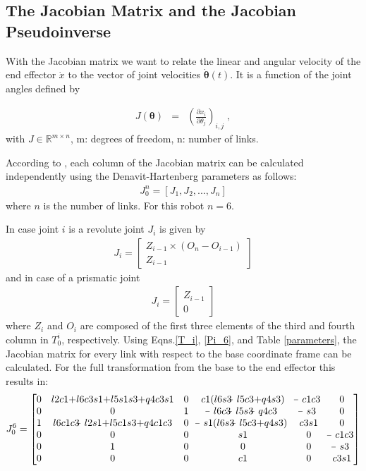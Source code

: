 \subsection{The Jacobian Matrix and the Jacobian Pseudoinverse}

With the Jacobian matrix we want to relate the linear and angular velocity of the end effector $\dot{x}$ to the vector of joint velocities $\dot{\bm{\theta}}(t)$. It is a function of the joint angles defined by

\begin{eqnarray}
	J(\bm{\theta}) &=&(\frac{\partial x_i}{\partial\theta_j})_{i,j} \; ,
\end{eqnarray}
with $J \in \mathbb{R}^{m\times n}$, m: degrees of freedom, n: number of links.
 
According to \cite{textbookJacobian}, each column of the Jacobian matrix can be calculated independently using  the Denavit-Hartenberg parameters as follows:
\begin{eqnarray}
	J_0^n=[J_1,J_2,... ,J_n]
\end{eqnarray}
where $n$ is the number of links. For this robot $n=6$.

In case joint $i$ is a revolute joint $J_i$ is given by
\begin{eqnarray}\label{i_revolute}
	J_i=	\begin{bmatrix}
			Z_{i-1}\times(O_n-O_{i-1})\\
			Z_{i-1}
		\end{bmatrix}	
\end{eqnarray}
and in case of a prismatic joint
\begin{eqnarray}\label{i_prismatic}
	J_i=	\begin{bmatrix}
			Z_{i-1}\\
			0
		\end{bmatrix}	
\end{eqnarray}
where $Z_i$ and $O_i$ are composed of the first three elements of the third and fourth column in $T_0^i$, respectively. Using Eqns.\ref{T_i}, \ref{Pi_6}, and Table \ref{parameters}, the Jacobian matrix for every link with respect to the base coordinate frame can be calculated. For the full transformation from the base to the end effector this results in:
\begin{eqnarray}\label{J_6}
	J_0^6=\begin{bmatrix}	
				0 & l2c1\matplus l6c3s1\matplus l5s1s3\matplus q4c3s1 & 0 & c1(l6s3\matminus l5c3\matplus q4s3) & \matminus c1c3 & 0\\
				0 & 0 & 1 & \matminus l6c3\matminus l5s3\matminus q4c3 & \matminus s3 & 0\\
				1 & l6c1c3\matminus l2s1\matplus l5c1s3\matplus q4c1c3 & 0 & \matminus s1(l6s3\matminus l5c3\matplus q4s3) & c3s1 & 0\\
				0 & 0 & 0 & s1 & 0 & \matminus c1c3\\
				0 & 1 & 0 & 0 & 0 & \matminus s3\\
				0 & 0 & 0 & c1 & 0 & c3s1\\
			\end{bmatrix}
\end{eqnarray}

